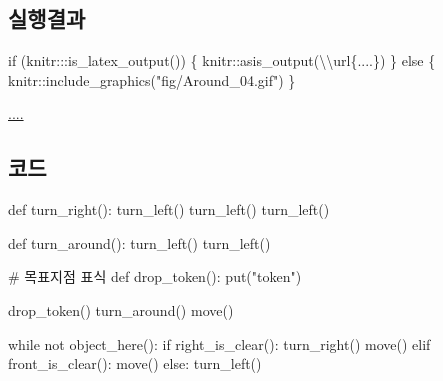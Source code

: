 \documentclass[
  b5paperpaper,
  DIV=11,
  numbers=noendperiod]{scrreprt}
\newenvironment{Shaded}{\begin{snugshade}}{\end{snugshade}}
\newcommand{\CommentTok}[1]{\textcolor[rgb]{0.37,0.37,0.37}{#1}}
\newcommand{\ControlFlowTok}[1]{\textcolor[rgb]{0.00,0.23,0.31}{#1}}
\newcommand{\FunctionTok}[1]{\textcolor[rgb]{0.28,0.35,0.67}{#1}}
\newcommand{\KeywordTok}[1]{\textcolor[rgb]{0.00,0.23,0.31}{#1}}
\newcommand{\NormalTok}[1]{\textcolor[rgb]{0.00,0.23,0.31}{#1}}
\newcommand{\SpecialCharTok}[1]{\textcolor[rgb]{0.37,0.37,0.37}{#1}}
\newcommand{\StringTok}[1]{\textcolor[rgb]{0.13,0.47,0.30}{#1}}
\begin{document}
\hypertarget{uxc2e4uxd589uxacb0uxacfc-8}{%
\subsection{실행결과}\label{uxc2e4uxd589uxacb0uxacfc-8}}

\begin{Shaded}
\begin{Highlighting}[]
\ControlFlowTok{if}\NormalTok{ (knitr}\SpecialCharTok{:::}\FunctionTok{is\_latex\_output}\NormalTok{()) \{}
\NormalTok{  knitr}\SpecialCharTok{::}\FunctionTok{asis\_output}\NormalTok{(}\StringTok{\textquotesingle{}}\SpecialCharTok{\textbackslash{}\textbackslash{}}\StringTok{url\{....\}\textquotesingle{}}\NormalTok{)}
\NormalTok{\} }\ControlFlowTok{else}\NormalTok{ \{}
\NormalTok{  knitr}\SpecialCharTok{::}\FunctionTok{include\_graphics}\NormalTok{(}\StringTok{"fig/Around\_04.gif"}\NormalTok{)}
\NormalTok{\}}
\end{Highlighting}
\end{Shaded}

\url{....}

\hypertarget{uxcf54uxb4dc-8}{%
\subsection{코드}\label{uxcf54uxb4dc-8}}

\begin{Shaded}
\begin{Highlighting}[]
\KeywordTok{def}\NormalTok{ turn\_right():}
\NormalTok{    turn\_left()}
\NormalTok{    turn\_left()}
\NormalTok{    turn\_left()}

\KeywordTok{def}\NormalTok{ turn\_around():}
\NormalTok{    turn\_left()}
\NormalTok{    turn\_left()}
    
    
\CommentTok{\# 목표지점 표식    }
\KeywordTok{def}\NormalTok{ drop\_token():}
\NormalTok{    put(}\StringTok{"token"}\NormalTok{)}

\NormalTok{drop\_token()}
\NormalTok{turn\_around()}
\NormalTok{move()}

\ControlFlowTok{while} \KeywordTok{not}\NormalTok{ object\_here():}
    \ControlFlowTok{if}\NormalTok{ right\_is\_clear():}
\NormalTok{        turn\_right()}
\NormalTok{        move()}
    \ControlFlowTok{elif}\NormalTok{ front\_is\_clear():}
\NormalTok{        move()}
    \ControlFlowTok{else}\NormalTok{:}
\NormalTok{        turn\_left()}
\end{Highlighting}
\end{Shaded}
\end{document}
